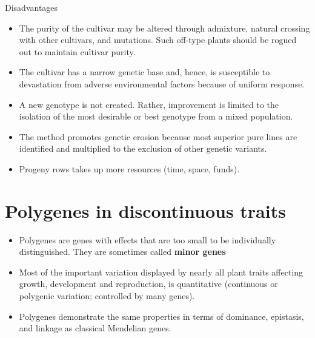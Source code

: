 \documentclass[11pt,dvipsnames,ignorenonframetext,aspectratio=169]{beamer}
\providecommand{\tightlist}{%
  \setlength{\itemsep}{0pt}\setlength{\parskip}{0pt}}
\begin{document}
\begin{frame}{Disadvantages}
\protect\hypertarget{disadvantages}{}
\begin{itemize}
\tightlist
\item
  The purity of the cultivar may be altered through admixture, natural
  crossing with other cultivars, and mutations. Such off-type plants
  should be rogued out to maintain cultivar purity.
\item
  The cultivar has a narrow genetic base and, hence, is susceptible to
  devastation from adverse environmental factors because of uniform
  response.
\item
  A new genotype is not created. Rather, improvement is limited to the
  isolation of the most desirable or best genotype from a mixed
  population.
\item
  The method promotes genetic erosion because most superior pure lines
  are identified and multiplied to the exclusion of other genetic
  variants.
\item
  Progeny rows takes up more resources (time, space, funds).
\end{itemize}
\end{frame}

\hypertarget{polygenes-in-discontinuous-traits}{%
\section{Polygenes in discontinuous
traits}\label{polygenes-in-discontinuous-traits}}

\begin{frame}{}
\protect\hypertarget{section-10}{}
\begin{itemize}
\tightlist
\item
  Polygenes are genes with effects that are too small to be individually
  distinguished. They are sometimes called \textbf{minor genes}
\item
  Most of the important variation displayed by nearly all plant traits
  affecting growth, development and reproduction, is quantitative
  (continuous or polygenic variation; controlled by many genes).
\item
  Polygenes demonstrate the same properties in terms of dominance,
  epistasis, and linkage as classical Mendelian genes.
\end{itemize}
\end{frame}
\end{document}
